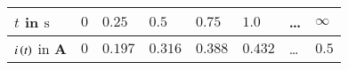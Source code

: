 \begin{tabular}{|l|l|l|l|l|l|l|l|}
\hline
$t$ in $\text{s}$ & $0$ & $0.25$ & $0.5$ & $0.75$ & $1.0$ & \dots &$\infty$ \\
\hline
$i\left(t\right)$ in $\textbf{A}$ & $0$ & $0.197$ & $0.316$ & $0.388$ & $0.432$ & \dots & $0.5$ \\
\hline
\end{tabular}
